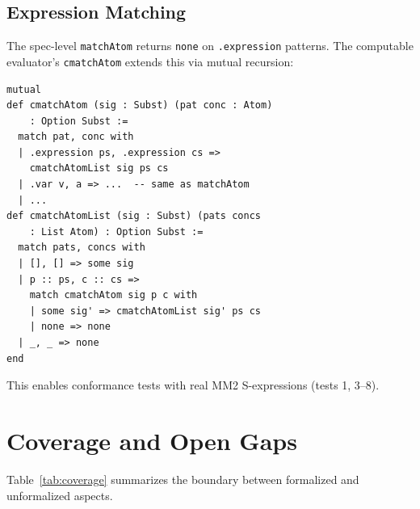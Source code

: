 \documentclass[11pt]{article}
\theoremstyle{definition}
\theoremstyle{remark}
\begin{document}
\subsection{Expression Matching}

The spec-level \texttt{matchAtom} returns \texttt{none} on
\texttt{.expression} patterns.  The computable evaluator's
\texttt{cmatchAtom} extends this via mutual recursion:

\begin{lstlisting}[caption={Expression matching (\texttt{Conformance.lean}).}]
mutual
def cmatchAtom (sig : Subst) (pat conc : Atom)
    : Option Subst :=
  match pat, conc with
  | .expression ps, .expression cs =>
    cmatchAtomList sig ps cs
  | .var v, a => ...  -- same as matchAtom
  | ...
def cmatchAtomList (sig : Subst) (pats concs
    : List Atom) : Option Subst :=
  match pats, concs with
  | [], [] => some sig
  | p :: ps, c :: cs =>
    match cmatchAtom sig p c with
    | some sig' => cmatchAtomList sig' ps cs
    | none => none
  | _, _ => none
end
\end{lstlisting}

\noindent
This enables conformance tests with real MM2 S-expressions (tests 1, 3--8).

\section{Coverage and Open Gaps}
\label{sec:gaps}

Table~\ref{tab:coverage} summarizes the boundary between formalized and
unformalized aspects.
\end{document}
